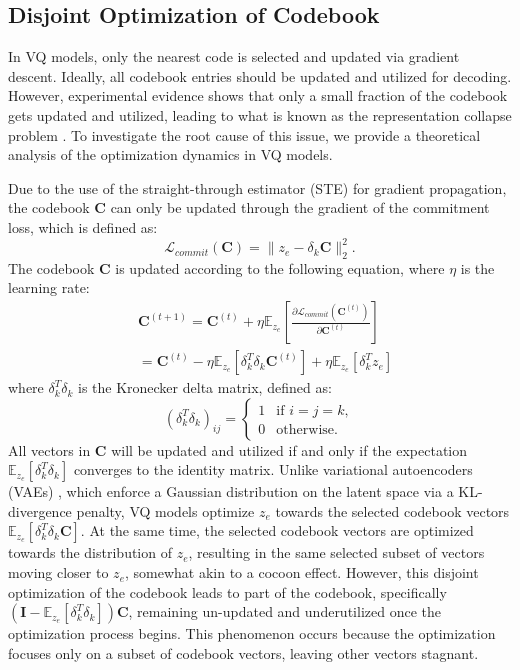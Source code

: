 \subsection{Disjoint Optimization of Codebook}

In VQ models, only the nearest code is selected and updated via gradient descent. Ideally, all codebook entries should be updated and utilized for decoding. However, experimental evidence shows that only a small fraction of the codebook gets updated and utilized, leading to what is known as the representation collapse problem \cite{roy2018theory}. To investigate the root cause of this issue, we provide a theoretical analysis of the optimization dynamics in VQ models.

Due to the use of the straight-through estimator (STE) for gradient propagation, the codebook $\bm{C}$ can only be updated through the gradient of the commitment loss, which is defined as:
\begin{equation}
    \mathcal{L}_{commit}(\bm{C})=\|z_e - \delta_k\bm{C}\|_2^2.
\end{equation}
The codebook $\bm{C}$ is updated according to the following equation, where $\eta$ is the learning rate:
\begin{align}
    &\bm{C}^{(t+1)} = \bm{C}^{(t)} + \eta \mathbb{E}_{z_e} \left[\frac{\partial \mathcal{L}_{commit}(\bm{C}^{(t)})}{\partial \bm{C}^{(t)}}\right] \\
    &= \bm{C}^{(t)} - \eta \mathbb{E}_{z_e} \left[\delta_k^T\delta_k\bm{C}^{(t)}\right] + \eta \mathbb{E}_{z_e} \left[\delta_{k}^{T}z_e\right]
\end{align}
where $\delta_k^T\delta_k$ is the Kronecker delta matrix, defined as:
\begin{equation}
    (\delta_k^T \delta_k)_{ij} =
\begin{cases}
1 & \text{if } i = j = k, \\
0 & \text{otherwise}.
\end{cases}
\end{equation}
All vectors in $\bm{C}$ will be updated and utilized if and only if the expectation $\mathbb{E}_{z_e}\left[\delta_k^T\delta_k \right]$ converges to the identity matrix. Unlike variational autoencoders (VAEs) \cite{Kingma2013AutoEncodingVB}, which enforce a Gaussian distribution on the latent space via a KL-divergence penalty, VQ models optimize $z_e$ towards the selected codebook vectors $\mathbb{E}_{z_e} \left[\delta_k^T\delta_k\bm{C}\right]$. At the same time, the selected codebook vectors are optimized towards the distribution of $z_e$, resulting in the same selected subset of vectors moving closer to $z_e$, somewhat akin to a cocoon effect. However, this disjoint optimization of the codebook leads to part of the codebook, specifically $(\bm{I} - \mathbb{E}_{z_e}\left[\delta_k^T\delta_k \right])\bm{C}$, remaining un-updated and underutilized once the optimization process begins. This phenomenon occurs because the optimization focuses only on a subset of codebook vectors, leaving other vectors stagnant.

